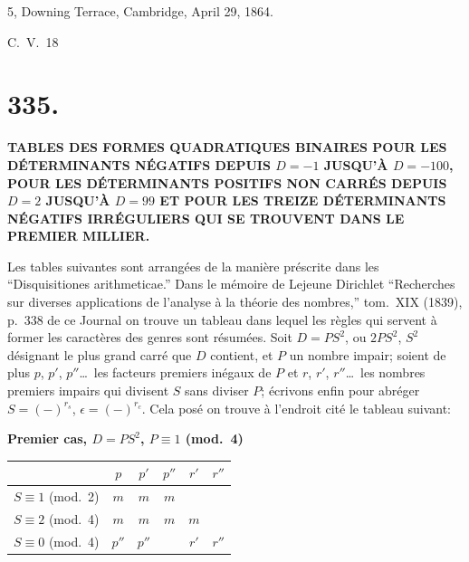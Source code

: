 \documentclass[11pt,a4paper]{article}
\begin{document}
\begin{flushright}
5, Downing Terrace, Cambridge, April 29, 1864.
\end{flushright}
\noindent C.\ V.\ 18


\newpage
\section*{335.}

\begin{center}
\textbf{TABLES DES FORMES QUADRATIQUES BINAIRES POUR LES D\'{E}TERMINANTS N\'{E}GATIFS DEPUIS $D=-1$ JUSQU'\`{A} $D=-100$, POUR LES D\'{E}TERMINANTS POSITIFS NON CARR\'{E}S DEPUIS $D=2$ JUSQU'\`{A} $D=99$ ET POUR LES TREIZE D\'{E}TERMINANTS N\'{E}GATIFS IRR\'{E}GULIERS QUI SE TROUVENT DANS LE PREMIER MILLIER.}
\end{center}


\bigskip

\noindent Les tables suivantes sont arrang\'{e}es de la mani\`{e}re pr\'{e}scrite dans les ``Disquisitiones arithmeticae.'' Dans le m\'{e}moire de Lejeune Dirichlet ``Recherches sur diverses applications de l'analyse \`{a} la th\'{e}orie des nombres,'' tom.\ XIX (1839), p.\ 338 de ce Journal on trouve un tableau dans lequel les r\`{e}gles qui servent \`{a} former les caract\`{e}res des genres sont r\'{e}sum\'{e}es. Soit $D = PS^2$, ou $2PS^2$, $S^2$ d\'{e}signant le plus grand carr\'{e} que $D$ contient, et $P$ un nombre impair; soient de plus $p$, $p'$, $p''$\ldots\ les facteurs premiers in\'{e}gaux de $P$ et $r$, $r'$, $r''$\ldots\ les nombres premiers impairs qui divisent $S$ sans diviser $P$; \'{e}crivons enfin pour abr\'{e}ger $S = (-)^{r_s}$, $\epsilon = (-)^{r_c}$. Cela pos\'{e} on trouve \`{a} l'endroit cit\'{e} le tableau suivant:

\begin{center}
\textbf{Premier cas, $D = PS^2$, $P \equiv 1$ (mod.\ 4)}
\end{center}
\begin{center}
\begin{tabular}{c|ccccc}
 & $p$ & $p'$ & $p''$ & $r'$ & $r''$ \\
\hline
$S \equiv 1$ (mod.\ 2) & $m$ & $m$ & $m$ & & \\
$S \equiv 2$ (mod.\ 4) & $m$ & $m$ & $m$ & $m$ & \\
$S \equiv 0$ (mod.\ 4) & $p''$ & $p''$ & & $r'$ & $r''$
\end{tabular}
\end{center}
\end{document}

